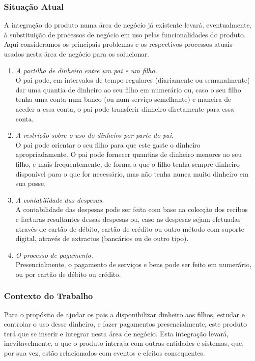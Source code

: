\documentclass[12pt,a4paper]{article}
\begin{document}
    \subsubsection{Situação Atual}
      A integração do produto numa área de negócio já existente levará, eventualmente, à substituição de processos de negócio em uso pelas funcionalidades do produto. Aqui consideramos os principais problemas e os respectivos processos atuais usados nesta área de negócio para os solucionar.

      \begin{enumerate}
        \item \emph{A partilha de dinheiro entre um pai e um filho.}\\
          O pai pode, em intervalos de tempo regulares (diariamente ou semanalmente) dar uma quantia de dinheiro ao seu filho em numerário ou, caso o seu filho tenha uma conta num banco (ou num serviço semelhante) e maneira de aceder a essa conta, o pai pode transferir dinheiro diretamente para essa conta.
        \item \emph{A restrição sobre o uso do dinheiro por parte do pai.}\\
          O pai pode orientar o seu filho para que este gaste o dinheiro apropriadamente. O pai pode fornecer quantias de dinheiro menores ao seu filho, e mais frequentemente, de forma a que o filho tenha sempre dinheiro disponível para o que for necessário, mas não tenha nunca muito dinheiro em sua posse.
        \item\emph{ A contabilidade das despesas.}\\
          A contabilidade das despesas pode ser feita com base na colecção dos recibos e facturas resultantes dessas despesas ou, caso as despesas sejam efetuadas através de cartão de débito, cartão de crédito ou outro método com suporte digital, através de extractos (bancários ou de outro tipo).
        \item  \emph{O processo de pagamento.}\\
       Presencialmente, o pagamento de serviços e bens pode ser feito em numerário, ou por cartão de débito ou crédito.
      \end{enumerate}

    \subsubsection{Contexto do Trabalho}
      
      Para o propósito de ajudar os pais a disponibilizar dinheiro aos filhos, estudar e controlar o uso desse dinheiro, e fazer pagamentos presencialmente, este produto terá que se inserir e integrar nesta área de negócio. Esta integração levará, inevitavelmente, a que o produto interaja com outras entidades e sistemas, que, por sua vez, estão relacionados com eventos e efeitos consequentes.
\end{document}

